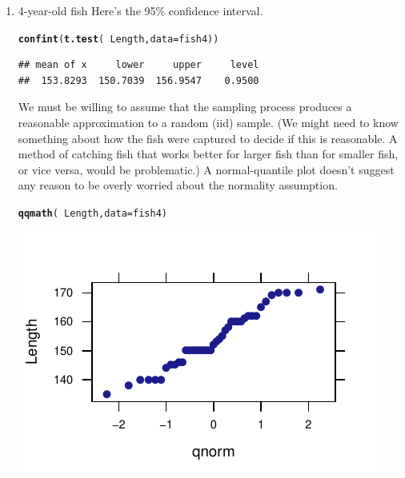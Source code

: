\documentclass[twoside]{book}\usepackage[]{graphicx}\usepackage[]{xcolor}
\makeatletter
\def\maxwidth{ %
  \ifdim\Gin@nat@width>\linewidth
    \linewidth
  \else
    \Gin@nat@width
  \fi
}
\newcommand{\hlopt}[1]{\textcolor[rgb]{0,0,0}{#1}}%
\newcommand{\hlstd}[1]{\textcolor[rgb]{0.345,0.345,0.345}{#1}}%
\newcommand{\hlkwc}[1]{\textcolor[rgb]{0.333,0.667,0.333}{#1}}%
\newcommand{\hlkwd}[1]{\textcolor[rgb]{0.737,0.353,0.396}{\textbf{#1}}}%
\newenvironment{kframe}{%
 \def\at@end@of@kframe{}%
 \ifinner\ifhmode%
  \def\at@end@of@kframe{\end{minipage}}%
  \begin{minipage}{\columnwidth}%
 \fi\fi%
 \def\FrameCommand##1{\hskip\@totalleftmargin \hskip-\fboxsep
 \colorbox{shadecolor}{##1}\hskip-\fboxsep
     \hskip-\linewidth \hskip-\@totalleftmargin \hskip\columnwidth}%
 \MakeFramed {\advance\hsize-\width
   \@totalleftmargin\z@ \linewidth\hsize
   \@setminipage}}%
 {\par\unskip\endMakeFramed%
 \at@end@of@kframe}
\newenvironment{knitrout}{}{} %
\makeatother
\begin{document}
\begin{solution}
	\begin{enumerate}
		\item 4-year-old fish
Here's the 95\% confidence interval.
\begin{knitrout}
\color{fgcolor}\begin{kframe}
\begin{alltt}
\hlkwd{confint}\hlstd{(}\hlkwd{t.test}\hlstd{(}\hlopt{~}\hlstd{Length,} \hlkwc{data} \hlstd{= fish4))}
\end{alltt}
\begin{verbatim}
## mean of x     lower     upper     level 
##  153.8293  150.7039  156.9547    0.9500
\end{verbatim}
\end{kframe}
\end{knitrout}
\noindent
We must be willing to assume that the sampling process produces a reasonable approximation
to a random (iid) sample.  (We might need to know something about how the fish were 
captured to decide if this is reasonable.  A method of catching fish that works better for 
larger fish than for smaller fish, or vice versa, would be problematic.)  
A normal-quantile plot doesn't suggest any reason to be overly worried about
the normality assumption.
\begin{knitrout}
\color{fgcolor}\begin{kframe}
\begin{alltt}
\hlkwd{qqmath}\hlstd{(}\hlopt{~}\hlstd{Length,} \hlkwc{data} \hlstd{= fish4)}
\end{alltt}
\end{kframe}

{\centering \includegraphics[width=\maxwidth]{figures/fig-unnamed-chunk-148-1} 

}
\end{knitrout}
\end{enumerate}
\end{solution}
\end{document}
